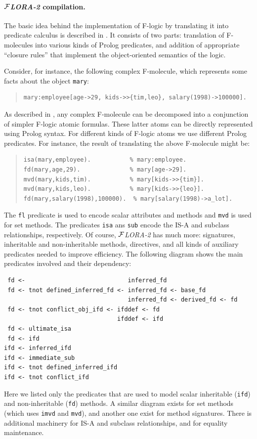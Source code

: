\documentclass[11pt]{article}
\newcommand{\FLORA}{{\mbox{${\cal F}${\small\it LORA}\rm\emph{-2}}}\xspace}
\newcommand{\fl}{\mbox{F-logic}\xspace}
\begin{document}
\paragraph{\FLORA compilation.}
The basic idea behind the implementation of \fl by translating it into
predicate calculus is described in \cite{KLW95}. It consists of two parts:
translation of F-molecules into various kinds of Prolog predicates, and
addition of appropriate ``closure rules'' that implement the
object-oriented semantics of the logic.

Consider, for instance, the following complex F-molecule, which represents
some facts about the object \texttt{mary}:

\begin{quote}
\begin{verbatim}
mary:employee[age->29, kids->>{tim,leo}, salary(1998)->100000].
\end{verbatim}
\end{quote}

As described in \cite{KLW95}, any complex F-molecule can be
decomposed into a conjunction of simpler \fl atomic formulas. These
latter atoms can be directly represented using Prolog syntax.  For
different kinds of \fl atoms we use different Prolog predicates. For
instance, the result of translating the above F-molecule might be:

\begin{quote}
\begin{verbatim}
isa(mary,employee).           % mary:employee.
fd(mary,age,29).              % mary[age->29].
mvd(mary,kids,tim).           % mary[kids->>{tim}].
mvd(mary,kids,leo).           % mary[kids->>{leo}].
fd(mary,salary(1998),100000).  % mary[salary(1998)->a_lot].
\end{verbatim}
\end{quote}

The {\tt fl} predicate is used to encode scalar attributes and methods and
{\tt mvd} is used for set methods. The predicates {\tt isa} ans {\tt sub}
encode the IS-A and subclass relationships, respectively.
Of course, \FLORA has much more: signatures, inheritable and
non-inheritable methods, directives, and all kinds of auxiliary predicates
needed to improve efficiency. The following diagram shows the main
predicates involved and their dependency:
\begin{verbatim}
 fd <-                             inferred_fd
 fd <- tnot defined_inferred_fd <- inferred_fd <- base_fd
                                   inferred_fd <- derived_fd <- fd
 fd <- tnot conflict_obj_ifd <- ifddef <- fd
                                ifddef <- ifd
 fd <- ultimate_isa
 fd <- ifd
ifd <- inferred_ifd
ifd <- immediate_sub
ifd <- tnot defined_inferred_ifd
ifd <- tnot conflict_ifd
\end{verbatim}
Here we listed only the predicates that are used to model scalar
inheritable ({\tt ifd}) and non-inheritable ({\tt fd}) methods.  A similar
diagram exists for set methods (which uses {\tt imvd} and {\tt mvd}), and
another one exist for method signatures. There is additional machinery for
IS-A and subclass relationships, and for equality maintenance.
\end{document}
